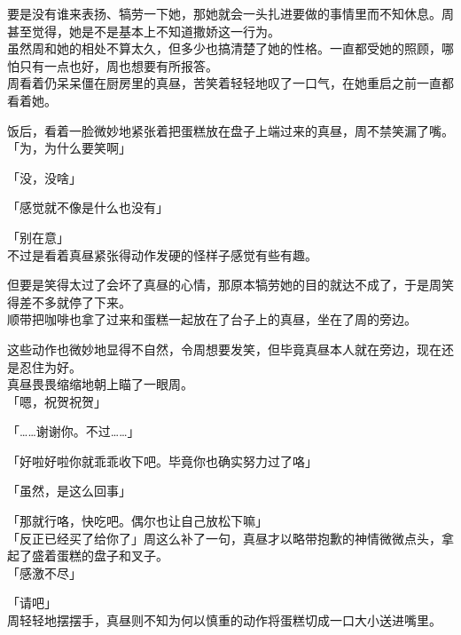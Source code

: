 要是没有谁来表扬、犒劳一下她，那她就会一头扎进要做的事情里而不知休息。周甚至觉得，她是不是基本上不知道撒娇这一行为。\\

虽然周和她的相处不算太久，但多少也搞清楚了她的性格。一直都受她的照顾，哪怕只有一点也好，周也想要有所报答。\\

周看着仍呆呆僵在厨房里的真昼，苦笑着轻轻地叹了一口气，在她重启之前一直都看着她。\\

\vspace{2\baselineskip}

饭后，看着一脸微妙地紧张着把蛋糕放在盘子上端过来的真昼，周不禁笑漏了嘴。\\

「为，为什么要笑啊」

「没，没啥」

「感觉就不像是什么也没有」

「别在意」\\

不过是看着真昼紧张得动作发硬的怪样子感觉有些有趣。

但要是笑得太过了会坏了真昼的心情，那原本犒劳她的目的就达不成了，于是周笑得差不多就停了下来。\\

顺带把咖啡也拿了过来和蛋糕一起放在了台子上的真昼，坐在了周的旁边。

这些动作也微妙地显得不自然，令周想要发笑，但毕竟真昼本人就在旁边，现在还是忍住为好。\\

真昼畏畏缩缩地朝上瞄了一眼周。\\

「嗯，祝贺祝贺」

「……谢谢你。不过……」

「好啦好啦你就乖乖收下吧。毕竟你也确实努力过了咯」

「虽然，是这么回事」

「那就行咯，快吃吧。偶尔也让自己放松下嘛」\\

「反正已经买了给你了」周这么补了一句，真昼才以略带抱歉的神情微微点头，拿起了盛着蛋糕的盘子和叉子。\\

「感激不尽」

「请吧」\\

周轻轻地摆摆手，真昼则不知为何以慎重的动作将蛋糕切成一口大小送进嘴里。\\

